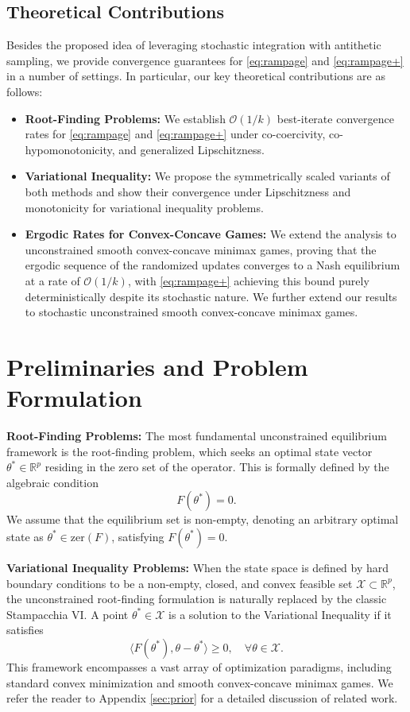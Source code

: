 \documentclass[letter,11pt]{article}
\begin{document}
\subsection{Theoretical Contributions}
Besides the proposed idea of leveraging stochastic integration with antithetic sampling, we provide convergence guarantees for \eqref{eq:rampage} and \eqref{eq:rampage+} in a number of settings. In particular, our key theoretical contributions are as follows:
\begin{itemize}[leftmargin=*]
 \item \textbf{Root-Finding Problems:} We establish $\mathcal{O}(1/k)$ best-iterate convergence rates for \eqref{eq:rampage} and \eqref{eq:rampage+} under co-coercivity, co-hypomonotonicity, and generalized Lipschitzness.
 \item \textbf{Variational Inequality:} We propose the symmetrically scaled variants of both methods and show their convergence under Lipschitzness and monotonicity for variational inequality problems.
 \item \textbf{Ergodic Rates for Convex-Concave Games:} We extend the analysis to unconstrained smooth convex-concave minimax games, proving that the ergodic sequence of the randomized updates converges to a Nash equilibrium at a rate of $\mathcal{O}(1/k)$, with \eqref{eq:rampage+} achieving this bound purely deterministically despite its stochastic nature. We further extend our results to stochastic unconstrained smooth convex-concave minimax games.
\end{itemize}
\section{Preliminaries and Problem Formulation}
\noindent\textbf{Root-Finding Problems:} The most fundamental unconstrained equilibrium framework is the root-finding problem, which seeks an optimal state vector $\theta^* \in \mathbb{R}^p$ residing in the zero set of the operator. This is formally defined by the algebraic condition
\begin{equation}\label{eq:rf}
\tag{RF}
F(\theta^*) = 0.
\end{equation}
We assume that the equilibrium set is non-empty, denoting an arbitrary optimal state as $\theta^* \in \mathrm{zer}(F)$, satisfying $F(\theta^*) = 0$.

\noindent\textbf{Variational Inequality Problems:} When the state space is defined by hard boundary conditions to be a non-empty, closed, and convex feasible set $\mathcal{X} \subset \mathbb{R}^p$, the unconstrained root-finding formulation is naturally replaced by the classic Stampacchia VI. A point $\theta^* \in \mathcal{X}$ is a solution to the Variational Inequality if it satisfies
\begin{equation} \label{eq:vi}
\tag{VI}
\langle F(\theta^*), \theta - \theta^* \rangle \ge 0, \quad \forall \theta \in \mathcal{X}.
\end{equation}
This framework encompasses a vast array of optimization paradigms, including standard convex minimization and smooth convex-concave minimax games. We refer the reader to Appendix \ref{sec:prior} for a detailed discussion of related work.
\end{document}
